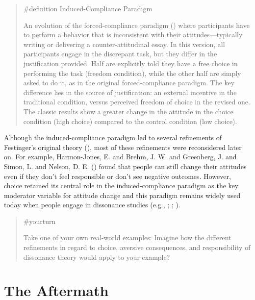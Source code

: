 \documentclass[
  letterpaper,
]{book}
\begin{document}
\begin{quote}
\label{def-inducedcomplianceparadigm}{\#definition}
Induced-Compliance Paradigm

An evolution of the forced-compliance paradigm
() where
participants have to perform a behavior that is inconsistent with their
attitudes---typically writing or delivering a counter-attitudinal essay.
In this version, all participants engage in the discrepant task, but
they differ in the justification provided. Half are explicitly told they
have a free choice in performing the task (freedom condition), while the
other half are simply asked to do it, as in the original
forced-compliance paradigm. The key difference lies in the source of
justification: an external incentive in the traditional condition,
versus perceived freedom of choice in the revised one. The classic
results show a greater change in the attitude in the choice condition
(high choice) compared to the control condition (low choice).
\end{quote}

Although the induced-compliance paradigm led to several refinements of
Festinger's original theory (),
most of these refinements were reconsidered later on. For example,
Harmon-Jones, E. and Brehm, J. W. and Greenberg, J. and Simon, L. and
Nelson, D. E. () found that
people can still change their attitudes even if they don't feel
responsible or don't see negative outcomes. However, choice retained its
central role in the induced-compliance paradigm as the key moderator
variable for attitude change and this paradigm remains widely used today
when people engage in dissonance studies (e.g.,
;
;
).

\begin{quote}
{\#yourturn}

Take one of your own real-world examples: Imagine how the different
refinements in regard to choice, aversive consequences, and
responsibility of dissonance theory would apply to your example?
\end{quote}

\section{The Aftermath}\label{the-aftermath-1}
\end{document}
